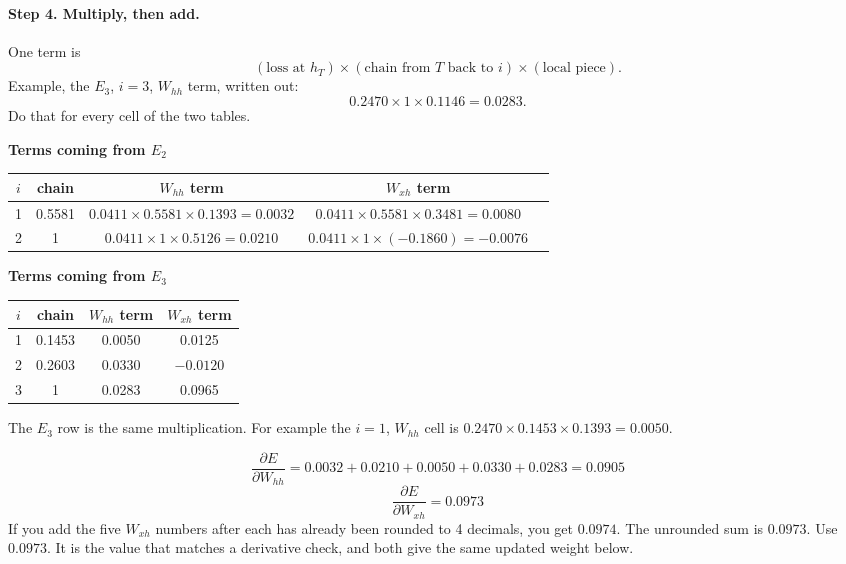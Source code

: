 \documentclass[11pt,a4paper]{article}
\begin{document}
\paragraph{Step 4. Multiply, then add.} One term is
\[
(\text{loss at }h_T)\times(\text{chain from }T\text{ back to }i)\times(\text{local piece}).
\]
Example, the \(E_3\), \(i=3\), \(W_{hh}\) term, written out:
\[
0.2470 \times 1 \times 0.1146 = 0.0283.
\]
Do that for every cell of the two tables.

\begin{center}
\textbf{Terms coming from \(E_2\)}\\[0.3em]
\begin{tabular}{ccccc}
\toprule
\(i\) & chain & \(W_{hh}\) term & \(W_{xh}\) term \\
\midrule
1 & 0.5581 & \(0.0411\times 0.5581\times 0.1393=0.0032\) & \(0.0411\times 0.5581\times 0.3481=0.0080\) \\
2 & 1 & \(0.0411\times 1\times 0.5126=0.0210\) & \(0.0411\times 1\times(-0.1860)=-0.0076\) \\
\bottomrule
\end{tabular}
\end{center}

\begin{center}
\textbf{Terms coming from \(E_3\)}\\[0.3em]
\begin{tabular}{cccc}
\toprule
\(i\) & chain & \(W_{hh}\) term & \(W_{xh}\) term \\
\midrule
1 & 0.1453 & 0.0050 & 0.0125 \\
2 & 0.2603 & 0.0330 & \(-0.0120\) \\
3 & 1 & 0.0283 & 0.0965 \\
\bottomrule
\end{tabular}
\end{center}

The \(E_3\) row is the same multiplication. For example the \(i=1\), \(W_{hh}\) cell is \(0.2470\times 0.1453\times 0.1393=0.0050\).

\begin{answer}[Q1(c)]
\[
\frac{\partial E}{\partial W_{hh}}
=0.0032+0.0210+0.0050+0.0330+0.0283
=0.0905
\]
\[
\frac{\partial E}{\partial W_{xh}}=0.0973
\]
If you add the five \(W_{xh}\) numbers after each has already been rounded to 4 decimals, you get \(0.0974\). The unrounded sum is \(0.0973\). Use \(0.0973\). It is the value that matches a derivative check, and both give the same updated weight below.
\end{answer}
\end{document}

